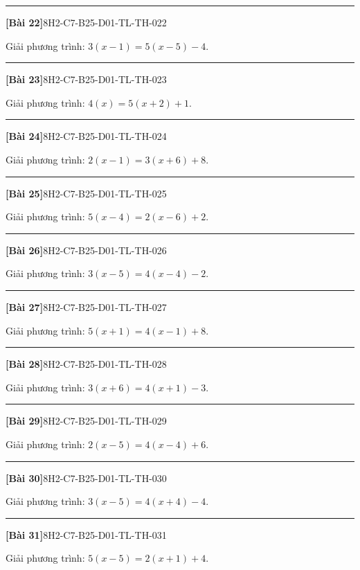 \documentclass[12pt,a4paper]{article}
\newif\ifloigiai
\newenvironment{cauhoi}[2]{%
  \par\medskip\noindent\rule{\textwidth}{0.4pt}\par\nopagebreak
  \noindent\textbf{[#1]}\hfill{\scriptsize\ttfamily #2}\par\nopagebreak\smallskip}{\par}
\newcommand{\loigiai}[1]{\ifloigiai\par\smallskip\noindent\textit{Lời giải.} #1\par\fi}
\begin{document}
\begin{cauhoi}{Bài 22}{8H2-C7-B25-D01-TL-TH-022}
Giải phương trình: $3(x - 1)=5(x - 5)-4$.
\loigiai{Khai triển hai vế: $3x - 3=5x - 29$. Chuyển vế, thu gọn ta được $-2x=-26$, suy ra $x=13$.}
\end{cauhoi}
\begin{cauhoi}{Bài 23}{8H2-C7-B25-D01-TL-TH-023}
Giải phương trình: $4(x)=5(x + 2)+1$.
\loigiai{Khai triển hai vế: $4x=5x + 11$. Chuyển vế, thu gọn ta được $-x=11$, suy ra $x=-11$.}
\end{cauhoi}
\begin{cauhoi}{Bài 24}{8H2-C7-B25-D01-TL-TH-024}
Giải phương trình: $2(x - 1)=3(x + 6)+8$.
\loigiai{Khai triển hai vế: $2x - 2=3x + 26$. Chuyển vế, thu gọn ta được $-x=28$, suy ra $x=-28$.}
\end{cauhoi}
\begin{cauhoi}{Bài 25}{8H2-C7-B25-D01-TL-TH-025}
Giải phương trình: $5(x - 4)=2(x - 6)+2$.
\loigiai{Khai triển hai vế: $5x - 20=2x - 10$. Chuyển vế, thu gọn ta được $3x=10$, suy ra $x=\dfrac{10}{3}$.}
\end{cauhoi}
\begin{cauhoi}{Bài 26}{8H2-C7-B25-D01-TL-TH-026}
Giải phương trình: $3(x - 5)=4(x - 4)-2$.
\loigiai{Khai triển hai vế: $3x - 15=4x - 18$. Chuyển vế, thu gọn ta được $-x=-3$, suy ra $x=3$.}
\end{cauhoi}
\begin{cauhoi}{Bài 27}{8H2-C7-B25-D01-TL-TH-027}
Giải phương trình: $5(x + 1)=4(x - 1)+8$.
\loigiai{Khai triển hai vế: $5x + 5=4x + 4$. Chuyển vế, thu gọn ta được $x=-1$, suy ra $x=-1$.}
\end{cauhoi}
\begin{cauhoi}{Bài 28}{8H2-C7-B25-D01-TL-TH-028}
Giải phương trình: $3(x + 6)=4(x + 1)-3$.
\loigiai{Khai triển hai vế: $3x + 18=4x + 1$. Chuyển vế, thu gọn ta được $-x=-17$, suy ra $x=17$.}
\end{cauhoi}
\begin{cauhoi}{Bài 29}{8H2-C7-B25-D01-TL-TH-029}
Giải phương trình: $2(x - 5)=4(x - 4)+6$.
\loigiai{Khai triển hai vế: $2x - 10=4x - 10$. Chuyển vế, thu gọn ta được $-2x=0$, suy ra $x=0$.}
\end{cauhoi}
\begin{cauhoi}{Bài 30}{8H2-C7-B25-D01-TL-TH-030}
Giải phương trình: $3(x - 5)=4(x + 4)-4$.
\loigiai{Khai triển hai vế: $3x - 15=4x + 12$. Chuyển vế, thu gọn ta được $-x=27$, suy ra $x=-27$.}
\end{cauhoi}
\begin{cauhoi}{Bài 31}{8H2-C7-B25-D01-TL-TH-031}
Giải phương trình: $5(x - 5)=2(x + 1)+4$.
\loigiai{Khai triển hai vế: $5x - 25=2x + 6$. Chuyển vế, thu gọn ta được $3x=31$, suy ra $x=\dfrac{31}{3}$.}
\end{cauhoi}
\end{document}
